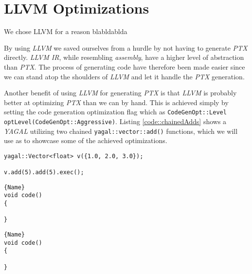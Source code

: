 \section{LLVM Optimizations}

We chose LLVM for a reason
blabldablda

By using \textit{LLVM} we saved ourselves from a hurdle by not having to generate \textit{PTX} directly. \textit{LLVM IR}, while resembling \textit{assembly}, have a higher level of abstraction than \textit{PTX}. The process of generating code have therefore been made easier since we can stand atop the shoulders of \textit{LLVM} and let it handle the \textit{PTX} generation.

Another benefit of using \textit{LLVM} for generating \textit{PTX} is that \textit{LLVM} is probably better at optimizing \textit{PTX} than we can by hand. This is achieved simply by setting the code generation optimization flag which as \texttt{CodeGenOpt::Level optLevel(CodeGenOpt::Aggressive)}. Listing \ref{code::chainedAdds} shows a \textit{YAGAL} utilizing two chained \texttt{yagal::vector::add()} functions, which we will use as to showcase some of the achieved optimizations.

\begin{lstlisting}[caption={Chained \texttt{yagal::vector::add}}, label={code::chainedAdds}]
yagal::Vector<float> v({1.0, 2.0, 3.0});

v.add(5).add(5).exec();
\end{lstlisting}

\noindent\begin{minipage}{0.45\paperwidth}
\begin{lstlisting}[caption=code 1,frame=tlrb]{Name}
void code()
{

}
\end{lstlisting}
\end{minipage}\hfill
\begin{minipage}{0.45\paperwidth}
\begin{lstlisting}[caption=code 2,frame=tlrb]{Name}
void code()
{

}
\end{lstlisting}
\end{minipage}

